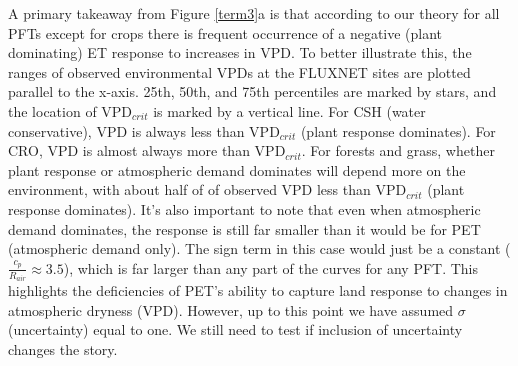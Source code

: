 \documentclass[draft,linenumbers]{agujournal}
\begin{document}
A primary takeaway from Figure \ref{term3}a is that according to our theory for all PFTs except for crops there is frequent occurrence of a negative (plant dominating) ET response to increases in VPD. To better illustrate this, the ranges of observed environmental VPDs at the FLUXNET sites are plotted parallel to the x-axis. 25th, 50th, and 75th percentiles are marked by stars, and the location of VPD$_{crit}$ is marked by a vertical line. For CSH (water conservative), VPD is always less than VPD$_{crit}$ (plant response dominates). For CRO, VPD is almost always more than VPD$_{crit}$. For forests and grass, whether plant response or atmospheric demand dominates will depend more on the environment, with about half of of observed VPD less than VPD$_{crit}$ (plant response dominates). It's also important to note that even when atmospheric demand dominates, the response is still far smaller than it would be for PET (atmospheric demand only). The sign term in this case would just be a constant ($\frac{c_p}{R_{air}} \approx 3.5$), which is far larger than any part of the curves for any PFT. This highlights the deficiencies of PET's ability to capture land response to changes in atmospheric dryness (VPD). However, up to this point we have assumed $\sigma$ (uncertainty) equal to one. We still need to test if inclusion of uncertainty changes the story.
\end{document}
